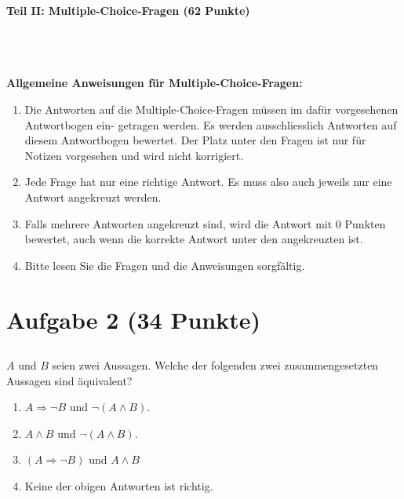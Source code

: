 \newpage


\begin{Large}
\textbf{Teil II: Multiple-Choice-Fragen (62 Punkte)}
\end{Large}
\\
\\
\\
\textbf{Allgemeine Anweisungen für Multiple-Choice-Fragen:}
\\
\renewcommand{\labelenumi}{(\roman{enumi})}
\begin{enumerate}
\item
Die Antworten auf die Multiple-Choice-Fragen müssen im dafür vorgesehenen Antwortbogen ein-
getragen werden. Es werden ausschliesslich Antworten auf diesem Antwortbogen bewertet. Der
Platz unter den Fragen ist nur für Notizen vorgesehen und wird nicht korrigiert.

\item
Jede Frage hat nur eine richtige Antwort. Es muss also auch jeweils nur eine Antwort angekreuzt werden.

\item
Falls mehrere Antworten angekreuzt sind, wird die Antwort mit 0 Punkten bewertet, auch wenn
die korrekte Antwort unter den angekreuzten ist.

\item
Bitte lesen Sie die Fragen und die Anweisungen sorgfältig.

\end{enumerate}

\section*{Aufgabe 2 (34 Punkte)}
\vspace{0.4cm}

\subsection*{}
$ A $ und $ B $ seien zwei Aussagen. Welche der folgenden zwei zusammengesetzten Aussagen sind äquivalent? 
 \renewcommand{\labelenumi}{(\alph{enumi})}
\begin{enumerate}
\item $ A \Rightarrow   \neg B $ und $\neg (A \wedge B)$.
\item $ A \wedge B $ und $\neg (A \wedge B)$.
\item $ (A \Rightarrow \neg B) $ und $A \wedge B$
\item Keine der obigen Antworten ist richtig.
\end{enumerate}
\ \\
